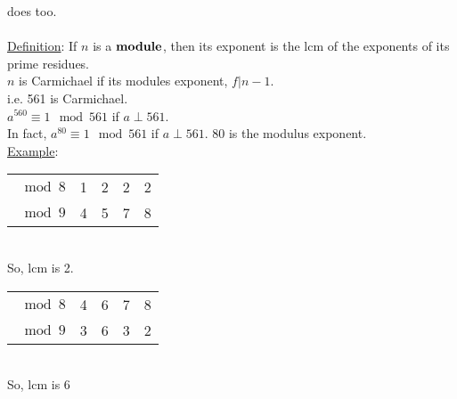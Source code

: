 \documentclass[13pt]{article}
\begin{document}
	does too.\\\\
%
	\underline{Definition}: If $n$ is a $\bf{module}$, then its exponent is the 
	lcm of the exponents of its prime residues.\\
	$n$ is Carmichael if its modules exponent, $f | n -1$.\\
	i.e. 561 is Carmichael.\\
	$a^{560} \equiv 1 \mod 561$ if $a \perp 561$.\\
	In fact, $a^{80} \equiv 1 \mod 561 $ if $a \perp 561 $. 80 is the modulus 
	exponent.\\
	\underline{Example}: \\
	\begin{tabular}{ c | c c c c}
	$\mod 8$ & 1 & 2 & 2 & 2 \\
	$\mod 9$ & 4 & 5 & 7 & 8 \\
	\end{tabular}\\
	So, lcm is 2.\\
	\begin{tabular}{ c | c c c c}
	$\mod 8$ & 4 & 6 & 7 & 8 \\
	$\mod 9$ & 3 & 6 & 3 & 2 \\
	\end{tabular}\\
	So, lcm is 6
\end{document}
